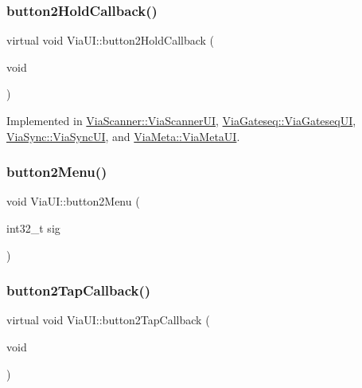\mbox{\label{class_via_u_i_a95bce2d662a8ae46be73497e868aebb9}} 
\subsubsection{\texorpdfstring{button2\+Hold\+Callback()}{button2HoldCallback()}}
{\footnotesize\ttfamily virtual void Via\+U\+I\+::button2\+Hold\+Callback (\begin{DoxyParamCaption}\item[{void}]{ }\end{DoxyParamCaption})\hspace{0.3cm}{\ttfamily [pure virtual]}}



Implemented in \mbox{\hyperlink{class_via_scanner_1_1_via_scanner_u_i_a9c61e3d9d4c2bf5ed21e63693c575c31}{Via\+Scanner\+::\+Via\+Scanner\+UI}}, \mbox{\hyperlink{class_via_gateseq_1_1_via_gateseq_u_i_a55e439bbec7d63aa2f0e732ec72aa2a2}{Via\+Gateseq\+::\+Via\+Gateseq\+UI}}, \mbox{\hyperlink{class_via_sync_1_1_via_sync_u_i_ad3759b21040068b5bf4ad9fd518b1c4c}{Via\+Sync\+::\+Via\+Sync\+UI}}, and \mbox{\hyperlink{class_via_meta_1_1_via_meta_u_i_acf5ef9a82372db43ab80437747167d9f}{Via\+Meta\+::\+Via\+Meta\+UI}}.

\mbox{\label{class_via_u_i_a98cab09e693942478ce7136e3077276a}} 
\subsubsection{\texorpdfstring{button2\+Menu()}{button2Menu()}}
{\footnotesize\ttfamily void Via\+U\+I\+::button2\+Menu (\begin{DoxyParamCaption}\item[{int32\+\_\+t}]{sig }\end{DoxyParamCaption})}

\mbox{\label{class_via_u_i_a8fce17e375ea6fe3a4746bff3e6dec75}} 
\subsubsection{\texorpdfstring{button2\+Tap\+Callback()}{button2TapCallback()}}
{\footnotesize\ttfamily virtual void Via\+U\+I\+::button2\+Tap\+Callback (\begin{DoxyParamCaption}\item[{void}]{ }\end{DoxyParamCaption})\hspace{0.3cm}{\ttfamily [pure virtual]}}



